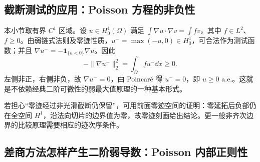 \subsection{截断测试的应用：Poisson 方程的非负性}

本小节取有界 $C^1$ 区域。设 $u\in H^1_0(\Omega)$ 满足 $\int\nabla u\cdot\nabla v=\int fv$，其中 $f\in L^2$、$f\ge0$。由弱链式法则及零迹性质，$u^-=\max(-u,0)\in H^1_0$，可合法作为测试函数；并且 $\nabla u^-=-\mathbf1_{\{u<0\}}\nabla u$。因此
\[
 -\|\nabla u^-\|_2^2=\int_\Omega fu^-\dd x\ge0.
\]
左侧非正，右侧非负，故 $\nabla u^-=0$，由 Poincar\'e 得 $u^-=0$，即 $u\ge0$ a.e.。这就是不依赖经典二阶可微性的弱最大值原理的一种基本形式。

若担心“零迹经过非光滑截断仍保留”，可用前面零迹空间的证明：零延拓后负部仍在全空间 $H^1$，沿法向切片的边界值为零，故零迹刻画给出结论。更一般非齐次边界的比较原理需要相应的迹次序条件。

\subsection{差商方法怎样产生二阶弱导数：Poisson 内部正则性}

